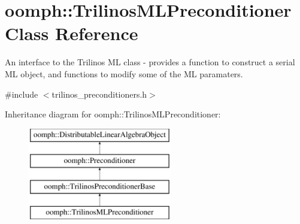 \hypertarget{classoomph_1_1TrilinosMLPreconditioner}{}\section{oomph\+:\+:Trilinos\+M\+L\+Preconditioner Class Reference}
\label{classoomph_1_1TrilinosMLPreconditioner}


An interface to the Trilinos ML class -\/ provides a function to construct a serial ML object, and functions to modify some of the ML paramaters.  




{\ttfamily \#include $<$trilinos\+\_\+preconditioners.\+h$>$}

Inheritance diagram for oomph\+:\+:Trilinos\+M\+L\+Preconditioner\+:\begin{figure}[H]
\begin{center}
\leavevmode
\includegraphics[height=4.000000cm]{classoomph_1_1TrilinosMLPreconditioner}
\end{center}
\end{figure}
